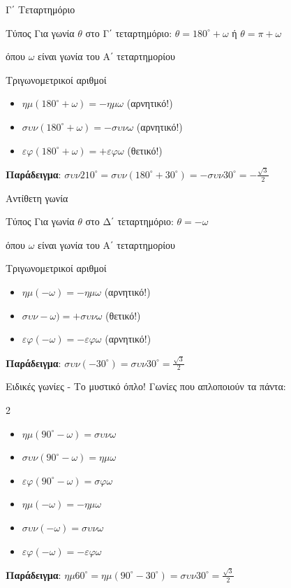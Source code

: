 \documentclass{presentation}
\begin{document}
\begin{frame}{Γ΄ Τεταρτημόριο}
  \begin{block}{Τύπος}
    Για γωνία $θ$ στο Γ΄ τεταρτημόριο: $θ=180^{\circ}+ω$ ή $θ=π+ω$

    όπου $ω$ είναι γωνία του Α΄ τεταρτημορίου
  \end{block}
  \pause

  \begin{exampleblock}{Τριγωνομετρικοί αριθμοί}
    \begin{itemize}[<+->]
      \item $ημ(180^{\circ}+ω)=-ημω$ (αρνητικό!)
      \item $συν(180^{\circ}+ω)=-συνω$ (αρνητικό!)
      \item $εφ(180^{\circ}+ω)=+εφω$ (θετικό!)
    \end{itemize}
  \end{exampleblock}
  \pause

  \textbf{Παράδειγμα}: $συν210^{\circ}=συν(180^{\circ}+30^{\circ})=-συν30^{\circ}=-\frac{\sqrt{3}}{2}$
\end{frame}

\begin{frame}{Αντίθετη γωνία}
  \begin{block}{Τύπος}
    Για γωνία $θ$ στο Δ΄ τεταρτημόριο: $θ=-ω$

    όπου $ω$ είναι γωνία του Α΄ τεταρτημορίου
  \end{block}
  \pause

  \begin{exampleblock}{Τριγωνομετρικοί αριθμοί}
    \begin{itemize}[<+->]
      \item $ημ(-ω)=-ημω$ (αρνητικό!)
      \item $συν-ω)=+συνω$ (θετικό!)
      \item $εφ(-ω)=-εφω$ (αρνητικό!)
    \end{itemize}
  \end{exampleblock}
  \pause

  \textbf{Παράδειγμα}: $συν(-30^{\circ})=συν30^{\circ}=\frac{\sqrt{3}}{2}$
\end{frame}

\begin{frame}{Ειδικές γωνίες - Το μυστικό όπλο!}
  Γωνίες που απλοποιούν τα πάντα:
  \begin{multicols}{2}
    \begin{itemize}[<+->]
      \item $ημ(90^{\circ}-ω)=συνω$
      \item $συν(90^{\circ}-ω)=ημω$
      \item $εφ(90^{\circ}-ω)=σφω$
      \item $ημ(-ω)=-ημω$
      \item $συν(-ω)=συνω$
      \item $εφ(-ω)=-εφω$
    \end{itemize}
  \end{multicols}
  \pause

  \textbf{Παράδειγμα}: $ημ60^{\circ}=ημ(90^{\circ}-30^{\circ})=συν30^{\circ}=\frac{\sqrt{3}}{2}$
\end{frame}
\end{document}
